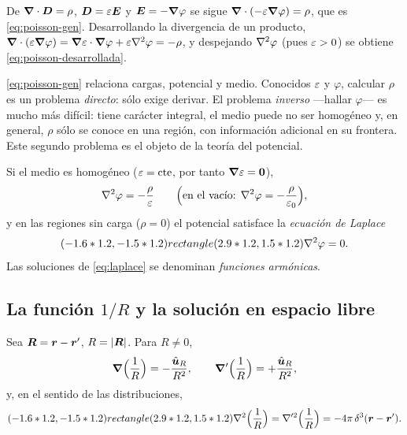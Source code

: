\documentclass[11pt,a4paper,twoside]{article}
\begin{document}
\begin{demostracion}
De $\bm{\nabla}\cdot\bm{D}=\rho$, $\bm{D}=\varepsilon\bm{E}$ y $\bm{E}=-\bm{\nabla}\varphi$ se sigue
$\bm{\nabla}\cdot(-\varepsilon\bm{\nabla}\varphi)=\rho$, que es \eqref{eq:poisson-gen}. Desarrollando la
divergencia de un producto,
$\bm{\nabla}\cdot(\varepsilon\bm{\nabla}\varphi)=\bm{\nabla}\varepsilon\cdot\bm{\nabla}\varphi+\varepsilon\nabla^{2}\varphi=-\rho$, y
despejando $\nabla^{2}\varphi$ (pues $\varepsilon>0$) se obtiene \eqref{eq:poisson-desarrollada}.
\end{demostracion}

\begin{observacion}
\eqref{eq:poisson-gen} relaciona cargas, potencial y medio. Conocidos $\varepsilon$ y $\varphi$,
calcular $\rho$ es un problema \emph{directo}: sólo exige derivar. El problema \emph{inverso}
---hallar $\varphi$--- es mucho más difícil: tiene carácter integral, el medio puede no ser
homogéneo y, en general, $\rho$ sólo se conoce en una región, con información adicional en su
frontera. Este segundo problema es el objeto de la teoría del potencial.
\end{observacion}

\begin{corolario}\label{cor:poisson-laplace}
Si el medio es homogéneo ($\varepsilon=\mathrm{cte}$, por tanto $\bm{\nabla}\varepsilon=\bm 0$),
\begin{equation}\label{eq:poisson}
  \nabla^{2}\varphi=-\frac{\rho}{\varepsilon}\qquad\Bigl(\text{en el vacío: }\nabla^{2}\varphi=-\frac{\rho}{\varepsilon_{0}}\Bigr),
\end{equation}
y en las regiones sin carga ($\rho=0$) el potencial satisface la \emph{ecuación de Laplace}
\begin{equation}\label{eq:laplace}
  (-1.6*1.2,-1.5*1.2) rectangle (2.9*1.2,1.5*1.2){\nabla^{2}\varphi=0.}
\end{equation}
Las soluciones de \eqref{eq:laplace} se denominan \emph{funciones armónicas}.
\end{corolario}

\subsection{La función $1/R$ y la solución en espacio libre}

\begin{lema}[Derivadas de $1/R$]\label{lem:1R}
Sea $\bm{R}=\bm{r}-\bm{r}'$, $R=\left\lvert \bm{R}\right\rvert$. Para $R\neq0$,
\begin{equation}\label{eq:grad1R}
  \bm{\nabla}\Bigl(\frac1R\Bigr)=-\frac{\hat{\bm{u}}_{R}}{R^{2}},\qquad
  \bm{\nabla}'\Bigl(\frac1R\Bigr)=+\frac{\hat{\bm{u}}_{R}}{R^{2}},
\end{equation}
y, en el sentido de las distribuciones,
\begin{equation}\label{eq:lap1R}
  (-1.6*1.2,-1.5*1.2) rectangle (2.9*1.2,1.5*1.2){\nabla^{2}\Bigl(\frac1R\Bigr)=\nabla'^{2}\Bigl(\frac1R\Bigr)=-4\pi\,\delta^{3}(\bm{r}-\bm{r}').}
\end{equation}
\end{lema}
\end{document}
